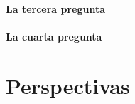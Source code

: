 \documentclass[../main]{subfiles}
\begin{document}
\begin{otherlanguage}{spanish}
\paragraph{La tercera pregunta}
\lipsum[4][1-6]

\paragraph{La cuarta pregunta}
\lipsum[5][1-6]

\sectionclose
\lipsum[6][1-3]

\section*{Perspectivas}
\lipsum[7][1-5]

\lipsum[8][1-5]

\sectionclose
\lipsum[9][1-3]
\end{otherlanguage}

\ifSubfilesClassLoaded{%
\newrefcontext[labelprefix=]
\printbibliography
}{}
\end{document}
